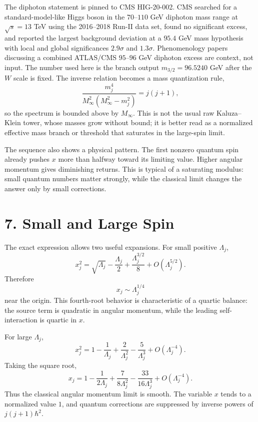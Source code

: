 \documentclass[11pt]{article}
\newcommand{\Lspin}{\Lambda_j}
\newcommand{\hb}{\hbar}
\begin{document}
The diphoton statement is pinned to CMS HIG-20-002. CMS searched for a standard-model-like Higgs boson in the \(70\)--\(110\) GeV diphoton mass range at \(\sqrt{s}=13\) TeV using the 2016--2018 Run-II data set, found no significant excess, and reported the largest background deviation at a \(95.4\) GeV mass hypothesis with local and global significances \(2.9\sigma\) and \(1.3\sigma\). Phenomenology papers discussing a combined ATLAS/CMS \(95\)--\(96\) GeV diphoton excess are context, not input. The number used here is the branch output \(m_{3/2}=96.5240\) GeV after the \(W\) scale is fixed.
The inverse relation becomes a mass quantization rule,
\[
        \frac{m_j^4}{M_\infty^2(M_\infty^2-m_j^2)}
        =j(j+1),
\]
so the spectrum is bounded above by \(M_\infty\). This is not the usual raw Kaluza--Klein tower, whose masses grow without bound; it is better read as a normalized effective mass branch or threshold that saturates in the large-spin limit.

The sequence also shows a physical pattern. The first nonzero quantum spin already pushes \(x\) more than halfway toward its limiting value. Higher angular momentum gives diminishing returns. This is typical of a saturating modulus: small quantum numbers matter strongly, while the classical limit changes the answer only by small corrections.


\section*{7. Small and Large Spin}

The exact expression allows two useful expansions. For small positive \(\Lspin\),
\begin{equation}
        x_j^2=\sqrt{\Lspin}-\frac{\Lspin}{2}
        +\frac{\Lspin^{3/2}}{8}+O(\Lspin^{5/2}) .
\end{equation}
Therefore
\begin{equation}
        x_j\sim \Lspin^{1/4}
\end{equation}
near the origin. This fourth-root behavior is characteristic of a quartic balance: the source term is quadratic in angular momentum, while the leading self-interaction is quartic in \(x\).

For large \(\Lspin\),
\begin{equation}
        x_j^2=1-\frac{1}{\Lspin}
        +\frac{2}{\Lspin^2}
        -\frac{5}{\Lspin^3}
        +O(\Lspin^{-4}) .
\end{equation}
Taking the square root,
\begin{equation}
        x_j=1-\frac{1}{2\Lspin}
        +\frac{7}{8\Lspin^2}
        -\frac{33}{16\Lspin^3}
        +O(\Lspin^{-4}) .
\end{equation}
Thus the classical angular momentum limit is smooth. The variable \(x\) tends to a normalized value \(1\), and quantum corrections are suppressed by inverse powers of \(j(j+1)\hb^2\).
\end{document}
